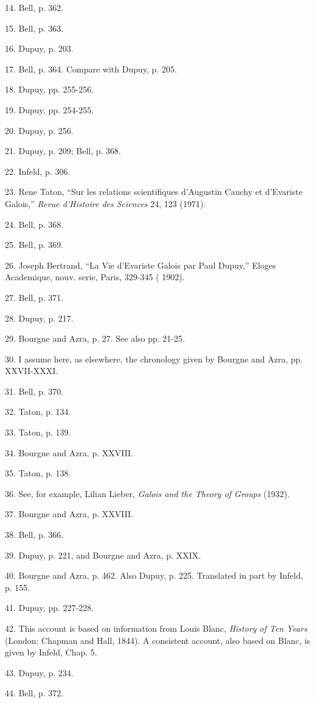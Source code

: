 \documentclass[12pt]{article}
\begin{document}
14. Bell, p. 362. 

15. Bell, p. 363. 

16. Dupuy, p. 203. 

17. Bell, p. 364. Compare with Dupuy, p. 205. 

18. Dupuy, pp. 255-256. 

19. Dupuy, pp. 254-255. 

20. Dupuy, p. 256. 

21. Dupuy, p. 209; Bell, p. 368. 

22. Infeld, p. 306. 

23. Rene Taton, ``Sur les relations scientifiques d'Augustin Cauchy et d'Evariste Galois,'' \emph{Revue d'Histoire des
Sciences} 24, 123 (1971). 

24. Bell, p. 368. 

25. Bell, p. 369. 

26. Joseph Bertrand, ``La Vie d'Evariste Galois par Paul Dupuy,'' Eloges Academique, nouv. serie, Paris, 329-345 (
1902). 

27. Bell, p. 371. 

28. Dupuy, p. 217. 

29. Bourgne and Azra, p. 27. See also pp. 21-25. 

30. I assume here, as elsewhere, the chronology given by Bourgne and Azra, pp. XXVII-XXXI. 

31. Bell, p. 370. 

32. Taton, p. 134. 

33. Taton, p. 139. 

34. Bourgne and Azra, p. XXVIII. 

35. Taton, p. 138. 

36. See, for example, Lilian Lieber, \emph{Galois and the Theory of Groups} (1932).

37. Bourgne and Azra, p. XXVIII. 

38. Bell, p. 366. 

39. Dupuy, p. 221, and Bourgne and Azra, p. XXIX.

40. Bourgne and Azra, p. 462. Also Dupuy, p. 225. Translated in part by Infeld, p. 155. 

41. Dupuy, pp. 227-228. 

42. This account is based on information from Louis Blanc, \emph{History of Ten Years} (London: Chapman and Hall, 1844). A
consistent account, also based on Blanc, is given by Infeld, Chap. 5. 

43. Dupuy, p. 234. 

44. Bell, p. 372. 
\end{document}
